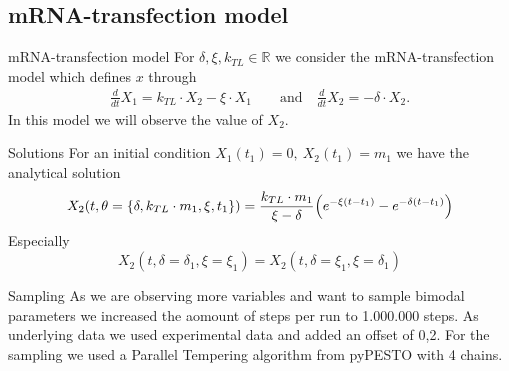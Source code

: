 \documentclass{beamer}
\newcommand{\R}{\mathbb{R}}
\begin{document}

\subsection{mRNA-transfection model}
	
	\begin{frame}{mRNA-transfection model}
		For $\delta, \xi, k_{TL} \in \R$ we consider the mRNA-transfection model 
		which defines $x$ through
		\begin{align*}
    		\frac{d}{dt}X_1 = k_{TL} \cdot X_2 - \xi \cdot X_1 \quad \quad 
    		\text{and} \quad \frac{d}{dt}X_2 = -\delta \cdot X_2.
		\end{align*}
		In this model we will observe the value of $X_2$.
	\end{frame}
	
	\begin{frame}{Solutions}
		For an initial condition $X_1(t_1) = 0, \ X_2(t_1) = m_1$ we have the 
		analytical solution
		\[
			X_2(t, \theta = \{\delta, k_{TL} \cdot m_1, \xi, t_1\}) = 
			\frac{k_{TL} \cdot m_1}{\xi - \delta} \Bigl(e^{-\xi (t - t_1)} 
			- e^{-\delta(t - t_1)}\Bigr)
		\]
		Especially
		\[
			X_2(t, \delta = \delta_1, \xi = \xi_1) = X_2(t, \delta = \xi_1,
			 \xi = \delta_1)
		\]
	\end{frame}
	
	\begin{frame}{Sampling}
		As we are observing more variables and want to sample bimodal parameters 
		we increased the aomount of steps per run to 1.000.000 steps. As 
		underlying data we used experimental data and added an offset of 0,2. For 
		the sampling we used a Parallel Tempering algorithm from pyPESTO with 4 
		chains.
	\end{frame}
	
\end{document}
